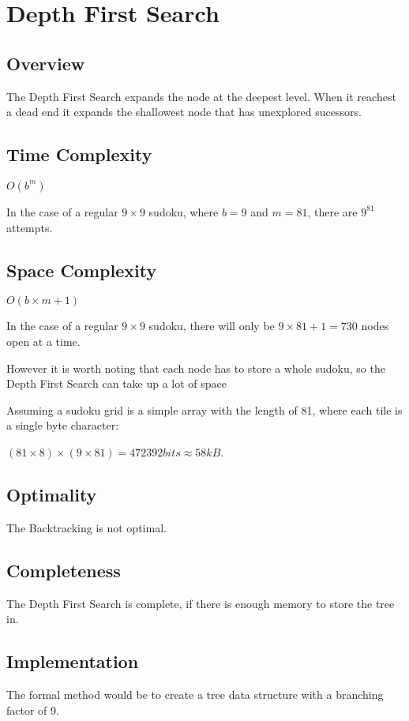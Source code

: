 \documentclass[10pt,letterpaper]{article}
\begin{document}
  \newpage
  \section{Depth First Search}
    \subsection{Overview}
      The Depth First Search expands the node at the deepest level. When it reachest a dead end it expands the shallowest node that has unexplored sucessors.
      
    \subsection{Time Complexity}
      \(O(b^m)\)
      
      In the case of a regular \(9\times 9\) sudoku, where  \(b = 9\) and \(m = 81\), there are \(9^{81}\) attempts.
  
    \subsection{Space Complexity}
      \(O(b\times m + 1)\)
      
      In the case of a regular \(9\times 9\) sudoku, there will only be \(9\times 81 + 1 = 730\) nodes open at a time.
      
      However it is worth noting that each node has to store a whole sudoku, so the Depth First Search can take up a lot of space 
      
      Assuming a sudoku grid is a simple array with the length of 81, where each tile is a single byte character:
	
      \((81 \times 8) \times (9 \times 81) = 472392bits \approx 58kB\).
      
    \subsection{Optimality}
      The Backtracking is not optimal.
    
    \subsection{Completeness}
      The Depth First Search is complete, if there is enough memory to store the tree in.
    
    \subsection{Implementation}
      The formal method would be to create a tree data structure with a branching factor of 9.
      
\end{document}
